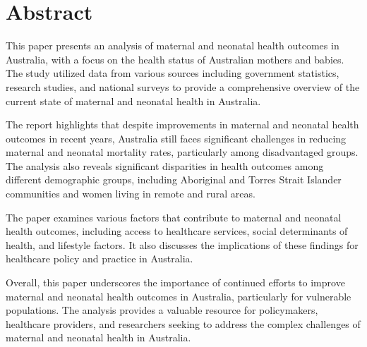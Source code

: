 \section{Abstract}
This paper presents an analysis of maternal and neonatal health outcomes in Australia, with a focus on the health status of Australian mothers and babies. The study utilized data from various sources including government statistics, research studies, and national surveys to provide a comprehensive overview of the current state of maternal and neonatal health in Australia.

The report highlights that despite improvements in maternal and neonatal health outcomes in recent years, Australia still faces significant challenges in reducing maternal and neonatal mortality rates, particularly among disadvantaged groups. The analysis also reveals significant disparities in health outcomes among different demographic groups, including Aboriginal and Torres Strait Islander communities and women living in remote and rural areas.

The paper examines various factors that contribute to maternal and neonatal health outcomes, including access to healthcare services, social determinants of health, and lifestyle factors. It also discusses the implications of these findings for healthcare policy and practice in Australia.

Overall, this paper underscores the importance of continued efforts to improve maternal and neonatal health outcomes in Australia, particularly for vulnerable populations. The analysis provides a valuable resource for policymakers, healthcare providers, and researchers seeking to address the complex challenges of maternal and neonatal health in Australia.